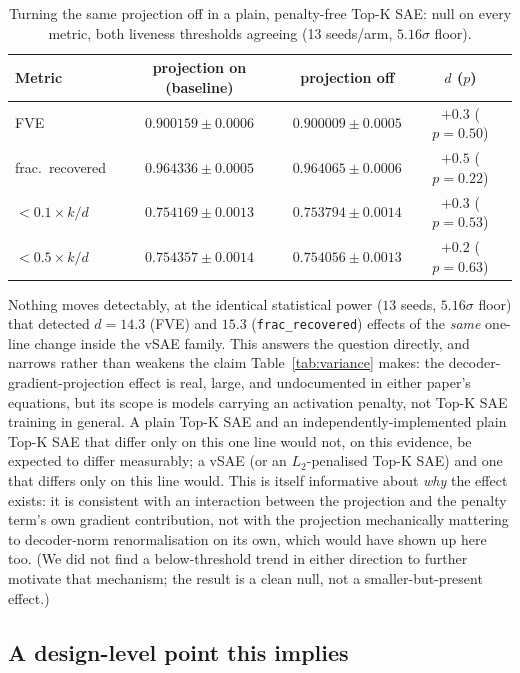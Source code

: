 \documentclass[11pt]{article}
\begin{document}
\begin{table}[h]
\centering
\caption{Turning the same projection off in a plain, penalty-free Top-K SAE:
null on every metric, both liveness thresholds agreeing (13 seeds/arm,
$5.16\sigma$ floor).}
\label{tab:claim4}
\begin{tabular}{lccc}
\toprule
Metric & projection on (baseline) & projection off & $d$ ($p$) \\
\midrule
FVE & $0.900159 \pm 0.0006$ & $0.900009 \pm 0.0005$ & $+0.3$ ($p=0.50$) \\
frac.\ recovered & $0.964336 \pm 0.0005$ & $0.964065 \pm 0.0006$ & $+0.5$ ($p=0.22$) \\
$<0.1\times k/d$ & $0.754169 \pm 0.0013$ & $0.753794 \pm 0.0014$ & $+0.3$ ($p=0.53$) \\
$<0.5\times k/d$ & $0.754357 \pm 0.0014$ & $0.754056 \pm 0.0013$ & $+0.2$ ($p=0.63$) \\
\bottomrule
\end{tabular}
\end{table}

Nothing moves detectably, at the identical statistical power ($13$ seeds,
$5.16\sigma$ floor) that detected $d=14.3$ (FVE) and $15.3$
(\texttt{frac\_recovered}) effects of the \emph{same} one-line change inside
the vSAE family. This answers the
question directly, and narrows rather than weakens the claim
Table~\ref{tab:variance} makes: the decoder-gradient-projection effect is
real, large, and undocumented in either paper's equations, but its scope is
models carrying an activation penalty, not Top-K SAE training in general. A
plain Top-K SAE and an independently-implemented plain Top-K SAE that differ
only on this one line would not, on this evidence, be expected to differ
measurably; a vSAE (or an $L_2$-penalised Top-K SAE) and one that differs
only on this line would. This is itself informative about \emph{why} the
effect exists: it is consistent with an interaction between the projection
and the penalty term's own gradient contribution, not with the projection
mechanically mattering to decoder-norm renormalisation on its own, which
would have shown up here too. (We did not find a below-threshold trend in
either direction to further motivate that mechanism; the result is a clean
null, not a smaller-but-present effect.)

\subsection{A design-level point this implies}
\label{sec:seedsurvey}
\end{document}
